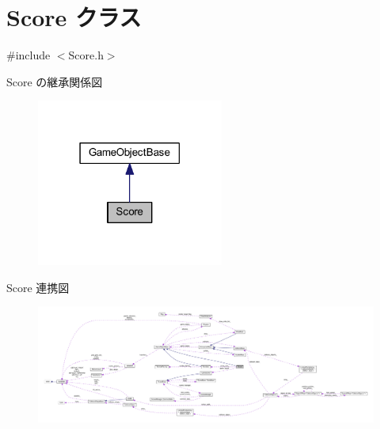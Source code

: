 \hypertarget{class_score}{}\section{Score クラス}
\label{class_score}


{\ttfamily \#include $<$Score.\+h$>$}



Score の継承関係図\nopagebreak
\begin{figure}[H]
\begin{center}
\leavevmode
\includegraphics[width=174pt]{class_score__inherit__graph}
\end{center}
\end{figure}


Score 連携図
\nopagebreak
\begin{figure}[H]
\begin{center}
\leavevmode
\includegraphics[width=350pt]{class_score__coll__graph}
\end{center}
\end{figure}
